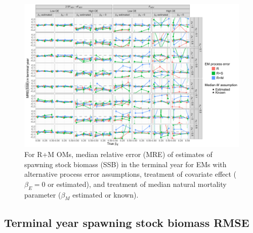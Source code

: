 \documentclass[
  12pt,
]{article}
\begin{document}
\begin{landscape}
\begin{figure}
\begin{center}
\includegraphics[height = \textheight]{terminal_year_ssb_bias_RMom}
\end{center}
\caption{For R+M OMs, median relative error (MRE) of estimates of spawning stock biomass (SSB) in the terminal year for EMs with alternative process error assumptions, treatment of covariate effect ($\beta_E = 0$ or estimated), and treatment of median natural mortality parameter ($\beta_M$ estimated or known).}\label{terminal_ssb_bias_RMom}
\end{figure}
\end{landscape}

\hypertarget{terminal-year-spawning-stock-biomass-rmse}{%
\subsection*{Terminal year spawning stock biomass RMSE}\label{terminal-year-spawning-stock-biomass-rmse}}
\end{document}
